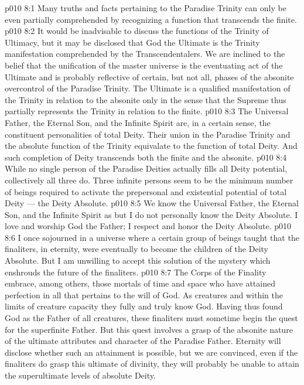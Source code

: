 \vs p010 8:1 Many truths and facts pertaining to the Paradise Trinity can only be even partially comprehended by recognizing a function that transcends the finite.
\vs p010 8:2 It would be inadvisable to discuss the functions of the Trinity of Ultimacy, but it may be disclosed that God the Ultimate is the Trinity manifestation comprehended by the Transcendentalers. We are inclined to the belief that the unification of the master universe is the eventuating act of the Ultimate and is probably reflective of certain, but not all, phases of the absonite overcontrol of the Paradise Trinity. The Ultimate is a qualified manifestation of the Trinity in relation to the absonite only in the sense that the Supreme thus partially represents the Trinity in relation to the finite.
\vs p010 8:3 \pc The Universal Father, the Eternal Son, and the Infinite Spirit are, in a certain sense, the constituent personalities of total Deity. Their union in the Paradise Trinity and the absolute function of the Trinity equivalate to the function of total Deity. And such completion of Deity transcends both the finite and the absonite.
\vs p010 8:4 While no single person of the Paradise Deities actually fills all Deity potential, collectively all three do. Three infinite persons seem to be the minimum number of beings required to activate the prepersonal and existential potential of total Deity --- the Deity Absolute.
\vs p010 8:5 We know the Universal Father, the Eternal Son, and the Infinite Spirit as  but I do not personally know the Deity Absolute. I love and worship God the Father; I respect and honor the Deity Absolute.
\vs p010 8:6 \pc I once sojourned in a universe where a certain group of beings taught that the finaliters, in eternity, were eventually to become the children of the Deity Absolute. But I am unwilling to accept this solution of the mystery which enshrouds the future of the finaliters.
\vs p010 8:7 The Corps of the Finality embrace, among others, those mortals of time and space who have attained perfection in all that pertains to the will of God. As creatures and within the limits of creature capacity they fully and truly know God. Having thus found God as the Father of all creatures, these finaliters must sometime begin the quest for the superfinite Father. But this quest involves a grasp of the absonite nature of the ultimate attributes and character of the Paradise Father. Eternity will disclose whether such an attainment is possible, but we are convinced, even if the finaliters do grasp this ultimate of divinity, they will probably be unable to attain the superultimate levels of absolute Deity.
